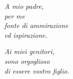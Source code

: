 \thispagestyle{empty}

\begin{flushright}
\Large\textit{
A mio padre,\\
per me\\
fonte di ammirazione\\
ed ispirazione.
}
\end{flushright}

\null\vfil

\begin{flushleft}
\Large\textit{Ai miei genitori,\\
sono orgoglioso\\
di essere vostro figlio.
}
\end{flushleft}

\cleardoublepage